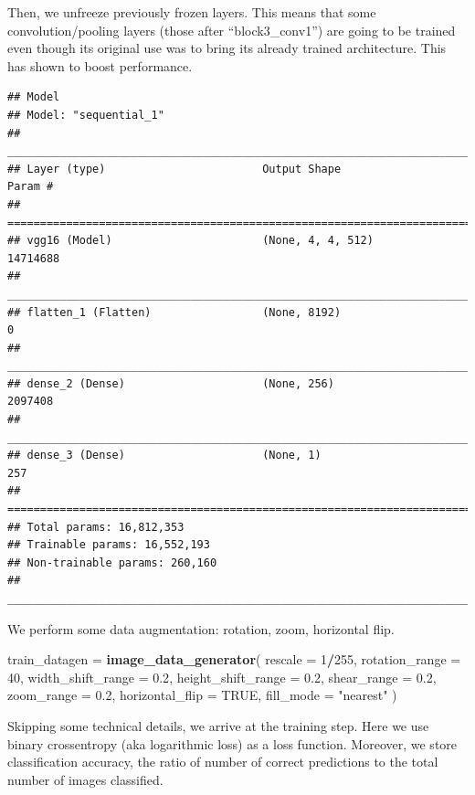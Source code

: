 \documentclass[]{book}
\newenvironment{Shaded}{\begin{snugshade}}{\end{snugshade}}
\newcommand{\DataTypeTok}[1]{\textcolor[rgb]{0.13,0.29,0.53}{#1}}
\newcommand{\DecValTok}[1]{\textcolor[rgb]{0.00,0.00,0.81}{#1}}
\newcommand{\FloatTok}[1]{\textcolor[rgb]{0.00,0.00,0.81}{#1}}
\newcommand{\KeywordTok}[1]{\textcolor[rgb]{0.13,0.29,0.53}{\textbf{#1}}}
\newcommand{\NormalTok}[1]{#1}
\newcommand{\OperatorTok}[1]{\textcolor[rgb]{0.81,0.36,0.00}{\textbf{#1}}}
\newcommand{\OtherTok}[1]{\textcolor[rgb]{0.56,0.35,0.01}{#1}}
\newcommand{\StringTok}[1]{\textcolor[rgb]{0.31,0.60,0.02}{#1}}
\begin{document}
Then, we unfreeze previously frozen layers. This means that some convolution/pooling layers (those after ``block3\_conv1'') are going to be trained even though its
original use was to bring its already trained architecture.
This has shown to boost performance.

\begin{verbatim}
## Model
## Model: "sequential_1"
## ________________________________________________________________________________
## Layer (type)                        Output Shape                    Param #     
## ================================================================================
## vgg16 (Model)                       (None, 4, 4, 512)               14714688    
## ________________________________________________________________________________
## flatten_1 (Flatten)                 (None, 8192)                    0           
## ________________________________________________________________________________
## dense_2 (Dense)                     (None, 256)                     2097408     
## ________________________________________________________________________________
## dense_3 (Dense)                     (None, 1)                       257         
## ================================================================================
## Total params: 16,812,353
## Trainable params: 16,552,193
## Non-trainable params: 260,160
## ________________________________________________________________________________
\end{verbatim}

We perform some data augmentation: rotation, zoom, horizontal flip.

\begin{Shaded}
\begin{Highlighting}[]
\NormalTok{train_datagen =}\StringTok{ }\KeywordTok{image_data_generator}\NormalTok{(}
  \DataTypeTok{rescale =} \DecValTok{1}\OperatorTok{/}\DecValTok{255}\NormalTok{,}
  \DataTypeTok{rotation_range =} \DecValTok{40}\NormalTok{,}
  \DataTypeTok{width_shift_range =} \FloatTok{0.2}\NormalTok{,}
  \DataTypeTok{height_shift_range =} \FloatTok{0.2}\NormalTok{,}
  \DataTypeTok{shear_range =} \FloatTok{0.2}\NormalTok{,}
  \DataTypeTok{zoom_range =} \FloatTok{0.2}\NormalTok{,}
  \DataTypeTok{horizontal_flip =} \OtherTok{TRUE}\NormalTok{,}
  \DataTypeTok{fill_mode =} \StringTok{"nearest"}
\NormalTok{)}
\end{Highlighting}
\end{Shaded}

Skipping some technical details, we arrive at the training step. Here we use binary crossentropy (aka logarithmic loss) as a loss function.
Moreover, we store classification accuracy, the ratio of number of correct predictions to the total number of images classified.
\end{document}
